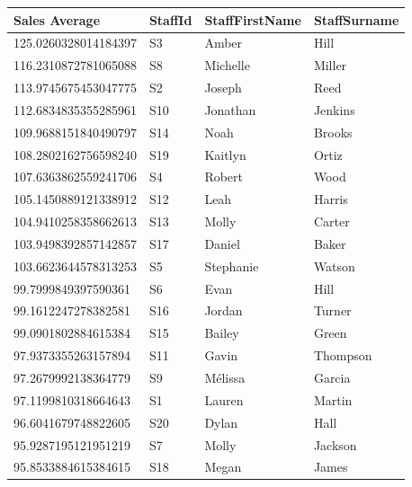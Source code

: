 \documentclass{article}
\begin{document}
            \begin{table}[H]
                \centering
                \begin{tabular}{|l|l|l|l|}
                \hline
                Sales Average        & StaffId & StaffFirstName & StaffSurname \\ \hline
                125.0260328014184397 & S3      & Amber          & Hill         \\ \hline
                116.2310872781065088 & S8      & Michelle       & Miller       \\ \hline
                113.9745675453047775 & S2      & Joseph         & Reed         \\ \hline
                112.6834835355285961 & S10     & Jonathan       & Jenkins      \\ \hline
                109.9688151840490797 & S14     & Noah           & Brooks       \\ \hline
                108.2802162756598240 & S19     & Kaitlyn        & Ortiz        \\ \hline
                107.6363862559241706 & S4      & Robert         & Wood         \\ \hline
                105.1450889121338912 & S12     & Leah           & Harris       \\ \hline
                104.9410258358662613 & S13     & Molly          & Carter       \\ \hline
                103.9498392857142857 & S17     & Daniel         & Baker        \\ \hline
                103.6623644578313253 & S5      & Stephanie      & Watson       \\ \hline
                99.7999849397590361  & S6      & Evan           & Hill         \\ \hline
                99.1612247278382581  & S16     & Jordan         & Turner       \\ \hline
                99.0901802884615384  & S15     & Bailey         & Green        \\ \hline
                97.9373355263157894  & S11     & Gavin          & Thompson     \\ \hline
                97.2679992138364779  & S9      & Mélissa        & Garcia       \\ \hline
                97.1199810318664643  & S1      & Lauren         & Martin       \\ \hline
                96.6041679748822605  & S20     & Dylan          & Hall         \\ \hline
                95.9287195121951219  & S7      & Molly          & Jackson      \\ \hline
                95.8533884615384615  & S18     & Megan          & James        \\ \hline
                \end{tabular}
            \end{table}
\end{document}
